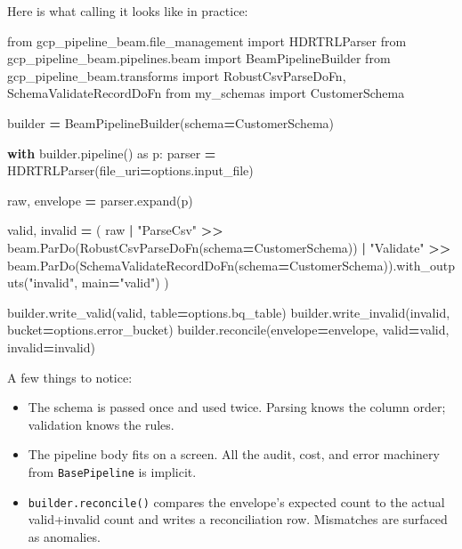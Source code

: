 \documentclass[
  11pt,
  british,
  oneside]{book}
\newenvironment{Shaded}{\begin{snugshade}}{\end{snugshade}}
\newcommand{\ControlFlowTok}[1]{\textcolor[rgb]{0.13,0.29,0.53}{\textbf{#1}}}
\newcommand{\ImportTok}[1]{#1}
\newcommand{\NormalTok}[1]{#1}
\newcommand{\OperatorTok}[1]{\textcolor[rgb]{0.81,0.36,0.00}{\textbf{#1}}}
\newcommand{\StringTok}[1]{\textcolor[rgb]{0.31,0.60,0.02}{#1}}
\providecommand{\tightlist}{%
  \setlength{\itemsep}{0pt}\setlength{\parskip}{0pt}}
\begin{document}
Here is what calling it looks like in practice:

\begin{Shaded}
\begin{Highlighting}[]
\ImportTok{from}\NormalTok{ gcp\_pipeline\_beam.file\_management }\ImportTok{import}\NormalTok{ HDRTRLParser}
\ImportTok{from}\NormalTok{ gcp\_pipeline\_beam.pipelines.beam }\ImportTok{import}\NormalTok{ BeamPipelineBuilder}
\ImportTok{from}\NormalTok{ gcp\_pipeline\_beam.transforms }\ImportTok{import}\NormalTok{ RobustCsvParseDoFn, SchemaValidateRecordDoFn}
\ImportTok{from}\NormalTok{ my\_schemas }\ImportTok{import}\NormalTok{ CustomerSchema}

\NormalTok{builder }\OperatorTok{=}\NormalTok{ BeamPipelineBuilder(schema}\OperatorTok{=}\NormalTok{CustomerSchema)}

\ControlFlowTok{with}\NormalTok{ builder.pipeline() }\ImportTok{as}\NormalTok{ p:}
\NormalTok{    parser }\OperatorTok{=}\NormalTok{ HDRTRLParser(file\_uri}\OperatorTok{=}\NormalTok{options.input\_file)}

\NormalTok{    raw, envelope }\OperatorTok{=}\NormalTok{ parser.expand(p)}

\NormalTok{    valid, invalid }\OperatorTok{=}\NormalTok{ (}
\NormalTok{        raw}
        \OperatorTok{|} \StringTok{"ParseCsv"} \OperatorTok{\textgreater{}\textgreater{}}\NormalTok{ beam.ParDo(RobustCsvParseDoFn(schema}\OperatorTok{=}\NormalTok{CustomerSchema))}
        \OperatorTok{|} \StringTok{"Validate"} \OperatorTok{\textgreater{}\textgreater{}}\NormalTok{ beam.ParDo(SchemaValidateRecordDoFn(schema}\OperatorTok{=}\NormalTok{CustomerSchema)).with\_outputs(}\StringTok{"invalid"}\NormalTok{, main}\OperatorTok{=}\StringTok{"valid"}\NormalTok{)}
\NormalTok{    )}

\NormalTok{    builder.write\_valid(valid, table}\OperatorTok{=}\NormalTok{options.bq\_table)}
\NormalTok{    builder.write\_invalid(invalid, bucket}\OperatorTok{=}\NormalTok{options.error\_bucket)}
\NormalTok{    builder.reconcile(envelope}\OperatorTok{=}\NormalTok{envelope, valid}\OperatorTok{=}\NormalTok{valid, invalid}\OperatorTok{=}\NormalTok{invalid)}
\end{Highlighting}
\end{Shaded}

A few things to notice:

\begin{itemize}
\tightlist
\item
  The schema is passed once and used twice. Parsing knows the column
  order; validation knows the rules.
\item
  The pipeline body fits on a screen. All the audit, cost, and error
  machinery from \texttt{BasePipeline} is implicit.
\item
  \texttt{builder.reconcile()} compares the envelope's expected count to
  the actual valid+invalid count and writes a reconciliation row.
  Mismatches are surfaced as anomalies.
\end{itemize}
\end{document}
